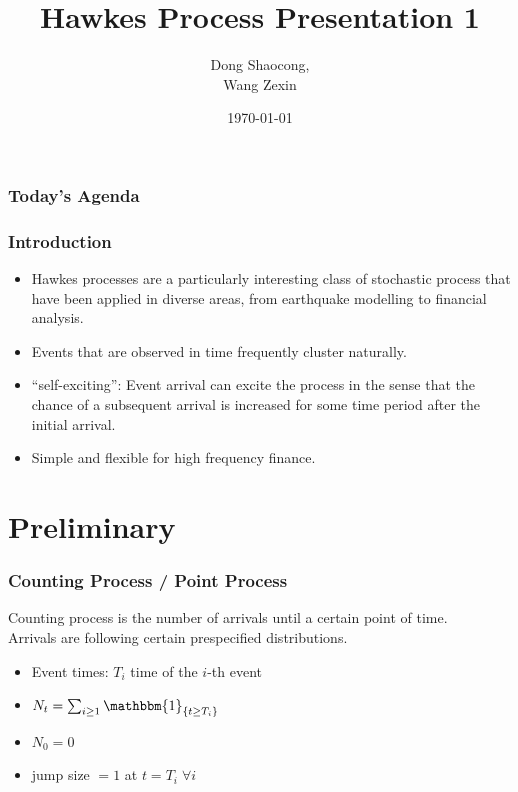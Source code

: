 \documentclass{beamer}
\title[Hawkes Process in Finance]{Hawkes Process Presentation 1} %
\author{Dong Shaocong, \\Wang Zexin} %
\institute[NUS]
{
Hawkes Process in Finance\\[3mm]
\medskip
\textit{Quantitative Finance\\
National University of Singapore\\}
}
\date{\today}
\begin{document}
\begin{frame}
\titlepage
\end{frame}


\begin{frame}
\frametitle{Today's Agenda}
\tableofcontents
\end{frame}

\begin{frame}
\frametitle{Introduction}
\begin{itemize}
	\item Hawkes processes are a particularly interesting class of stochastic process that have been applied in diverse areas, from earthquake modelling to financial analysis.
	\item Events that are observed in time frequently cluster naturally.
	\item ``self-exciting'': Event arrival can excite the process in the sense that the chance of a subsequent arrival is increased for some time period after the initial arrival.
	\item Simple and flexible for high frequency finance.
\end{itemize}
\end{frame}

\section{Preliminary} %
\begin{frame}
\frametitle{Counting Process / Point Process}
Counting process is the number of arrivals until a certain point of time.\\
Arrivals are following certain prespecified distributions.
\begin{itemize}
	\item Event times: $T_i$ time of the $i$-th event
	\item $N_t = \sum_{i \ge 1} \mathbbm{1}_{\{ t \ge T_i\}}$
	\item $N_0 = 0$
	\item jump size $= 1$ at $t = T_i \; \forall i$
\end{itemize}
\end{frame}
\end{document}
